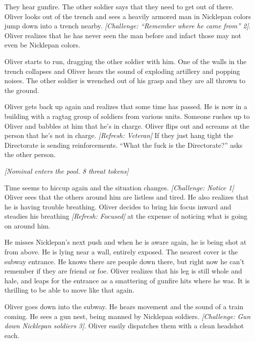 They hear gunfire.  The other soldier says that they need to get out of there.  Oliver looks out of the trench and sees a heavily armored man in Nicklepan colors jump down into a trench nearby. \textit{{[}Challenge: ``Remember where he came from'' 2{]}}.  Oliver realizes that he has never seen the man before and infact those may not even be Nicklepan colors.



Oliver starts to run, dragging the other soldier with him.  One of the walls in the trench collapses and Oliver hears the sound of exploding artillery and popping noises.  The other soldier is wrenched out of his grasp and they are all thrown to the ground.



Oliver gets back up again and realizes that some time has passed.  He is now in a building with a ragtag group of soldiers from various units.  Someone rushes up to Oliver and babbles at him that he's in charge. Oliver flips out and screams at the person that he's not in charge.  \textit{{[}Refresh: Veteran{]} }If they just hang tight the Directorate is sending reinforcements.  ``What the fuck is the Directorate?'' asks the other person.



\textit{{[}Nominal enters the pool.  8 threat tokens{]}}



Time seems to hiccup again and the situation changes.  \textit{{[}Challenge: Notice 1{]} }Oliver sees that the others around him are listless and tired.  He also realizes that he is having trouble breathing.  Oliver decides to bring his focus inward and steadies his breathing \textit{{[}Refresh: Focused{]} }at the expense of noticing what is going on around him.  



He misses Nicklepan's next push and when he is aware again, he is being shot at from above.  He is lying near a wall, entirely exposed.  The nearest cover is the subway entrance. He knows there are people down there, but right now he can't remember if they are friend or foe.  Oliver realizes that his leg is still whole and hale, and leaps for the entrance as a smattering of gunfire hits where he was.  It is thrilling to be able to move like that again.



Oliver goes down into the subway.  He hears movement and the sound of a train coming.  He sees a gun nest, being manned by Nicklepan soldiers. \textit{{[}Challenge: Gun down Nicklepan soldiers 3{]}}.  Oliver easily dispatches them with a clean headshot each.



